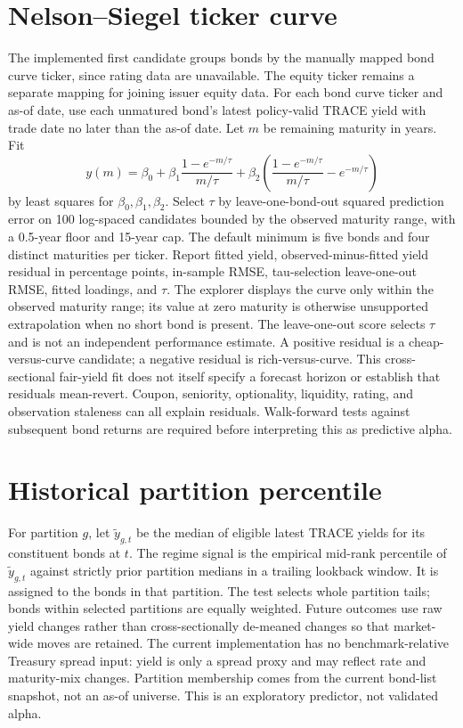 \documentclass[11pt]{article}
\begin{document}
\section{Nelson--Siegel ticker curve}
The implemented first candidate groups bonds by the manually mapped bond curve ticker, since rating data are unavailable. The equity ticker remains a separate mapping for joining issuer equity data. For each bond curve ticker and as-of date, use each unmatured bond's latest policy-valid TRACE yield with trade date no later than the as-of date. Let $m$ be remaining maturity in years. Fit
\[
y(m)=\beta_0+\beta_1\frac{1-e^{-m/\tau}}{m/\tau}+\beta_2\left(\frac{1-e^{-m/\tau}}{m/\tau}-e^{-m/\tau}\right)
\]
by least squares for $\beta_0,\beta_1,\beta_2$. Select $\tau$ by leave-one-bond-out squared prediction error on 100 log-spaced candidates bounded by the observed maturity range, with a 0.5-year floor and 15-year cap. The default minimum is five bonds and four distinct maturities per ticker. Report fitted yield, observed-minus-fitted yield residual in percentage points, in-sample RMSE, tau-selection leave-one-out RMSE, fitted loadings, and $\tau$. The explorer displays the curve only within the observed maturity range; its value at zero maturity is otherwise unsupported extrapolation when no short bond is present. The leave-one-out score selects $\tau$ and is not an independent performance estimate. A positive residual is a cheap-versus-curve candidate; a negative residual is rich-versus-curve. This cross-sectional fair-yield fit does not itself specify a forecast horizon or establish that residuals mean-revert. Coupon, seniority, optionality, liquidity, rating, and observation staleness can all explain residuals. Walk-forward tests against subsequent bond returns are required before interpreting this as predictive alpha.
\section{Historical partition percentile}
For partition $g$, let $\tilde y_{g,t}$ be the median of eligible latest TRACE yields for its constituent bonds at $t$. The regime signal is the empirical mid-rank percentile of $\tilde y_{g,t}$ against strictly prior partition medians in a trailing lookback window. It is assigned to the bonds in that partition. The test selects whole partition tails; bonds within selected partitions are equally weighted. Future outcomes use raw yield changes rather than cross-sectionally de-meaned changes so that market-wide moves are retained. The current implementation has no benchmark-relative Treasury spread input: yield is only a spread proxy and may reflect rate and maturity-mix changes. Partition membership comes from the current bond-list snapshot, not an as-of universe. This is an exploratory predictor, not validated alpha.
\end{document}
